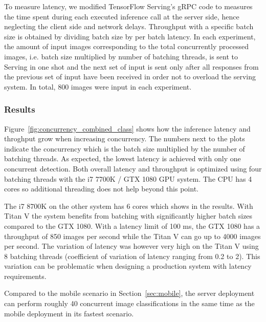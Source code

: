 \documentclass[sigconf]{acmart}
\begin{document}
To measure latency, we modified TensorFlow Serving's gRPC code to measures the time spent during each executed inference call at the server side, hence neglecting the client side and network delays. Throughput with a specific batch size is obtained by dividing batch size by per batch latency. In each experiment, the amount of input images corresponding to the total concurrently processed images, i.e. batch size multiplied by number of batching threads, is sent to Serving in one shot and the next set of input is sent only after all responses from the previous set of input have been received in order not to overload the serving system. In total, 800 images were input in each experiment.

\subsubsection{Results}
Figure~\ref{fig:concurrency_combined_class} shows how the inference latency and throghput grow when increasing concurrency. The numbers next to the plots indicate the concurrency which is the batch size multiplied by the number of batching threads. As expected, the lowest latency is achieved with only one concurrent detection. Both overall latency and throughput is optimized using four batching threads with the i7 7700K / GTX 1080 GPU system. The CPU has 4 cores so additional threading does not help beyond this point.

The i7 8700K on the other system has 6 cores which shows in the results. With Titan V the system benefits from batching with significantly higher batch sizes compared to the GTX 1080. With a latency limit of 100 ms, the GTX 1080 has a throughput of 850 images per second while the Titan V can go up to 4000 images per second. The variation of latency was however very high on the Titan V using 8 batching threads (coefficient of variation of latency ranging from 0.2 to 2). This variation can be problematic when designing a production system with latency requirements.

Compared to the mobile scenario in Section~\ref{sec:mobile}, the server deployment can perform roughly 40 concurrent image classifications in the same time as the mobile deployment in its fastest scenario.
\end{document}
